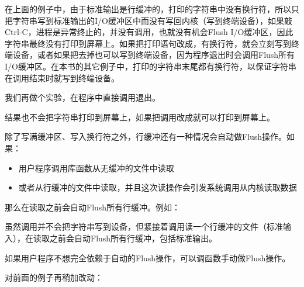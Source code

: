 在上面的例子中，由于标准输出是行缓冲的，打印的字符串中没有换行符，所以只把字符串写到标准输出的I/\BookSplit{}O缓冲区中而没有写回内核（写到终端设备），如果敲Ctrl-C，进程是异常终止的，并没有调用，也就没有机会Flush I/\BookSplit{}O缓冲区，因此字符串最终没有打印到屏幕上。如果把打印语句改成，有换行符，就会立刻写到终端设备，或者如果把去掉也可以写到终端设备，因为程序退出时会调用Flush所有I/\BookSplit{}O缓冲区。在本书的其它例子中，打印的字符串末尾都有换行符，以保证字符串在调用结束时就写到终端设备。



我们再做个实验，在程序中直接调用退出。




结果也不会把字符串打印到屏幕上，如果把调用改成就可以打印到屏幕上。



除了写满缓冲区、写入换行符之外，行缓冲还有一种情况会自动做Flush操作。如果：


\begin{itemize}

\item 用户程序调用库函数从无缓冲的文件中读取

\item 或者从行缓冲的文件中读取，并且这次读操作会引发系统调用从内核读取数据
\end{itemize}


那么在读取之前会自动Flush所有行缓冲。例如：




虽然调用并不会把字符串写到设备，但紧接着调用读一个行缓冲的文件（标准输入），在读取之前会自动Flush所有行缓冲，包括标准输出。



如果用户程序不想完全依赖于自动的Flush操作，可以调函数手动做Flush操作。




对前面的例子再稍加改动：




